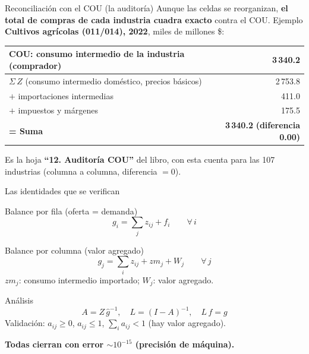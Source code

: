 \documentclass[aspectratio=169,10pt]{beamer}
\newcommand{\dg}[1]{\widehat{#1}}
\begin{document}
\begin{frame}{Reconciliación con el COU (la auditoría)}
  Aunque las celdas se reorganizan, \textbf{el total de compras de cada industria cuadra exacto} contra el COU.
  Ejemplo \textbf{Cultivos agrícolas (011/014), 2022}, miles de millones \$:
  \begin{center}
  \begin{tabular}{lr}
    \toprule
    COU: consumo intermedio de la industria (comprador) & \textbf{3\,340.2} \\
    \midrule
    $\Sigma\,Z$ (consumo intermedio doméstico, precios básicos) & 2\,753.8 \\
    $+$ importaciones intermedias & 411.0 \\
    $+$ impuestos y márgenes & 175.5 \\
    \midrule
    \textbf{= Suma} & \textbf{3\,340.2} \quad\color{verdeok}\textbf{(diferencia 0.00)} \\
    \bottomrule
  \end{tabular}
  \end{center}
  \vspace{0.3em}
  \begin{center}\small\color{gris}
  Es la hoja \textbf{``12. Auditoría COU''} del libro, con esta cuenta para las 107 industrias
  (columna a columna, diferencia $=0$).
  \end{center}
\end{frame}

\begin{frame}{Las identidades que se verifican}
  \begin{block}{Balance por fila (oferta = demanda)}
  \[ g_i = \sum_j z_{ij} + f_i \qquad \forall\, i \]
  \end{block}
  \begin{block}{Balance por columna (valor agregado)}
  \[ g_j = \sum_i z_{ij} + zm_j + W_j \qquad \forall\, j \]
  \footnotesize $zm_j$: consumo intermedio importado; \; $W_j$: valor agregado.
  \end{block}
  \begin{block}{Análisis}
  \[ A = Z\,\dg{g}^{-1}, \quad L = (I-A)^{-1}, \quad L\,f = g \]
  Validación: $a_{ij}\ge 0$, \; $a_{ij}\le 1$, \; $\sum_i a_{ij} < 1$ (hay valor agregado).
  \end{block}
  \begin{center}\small\color{verdeok}\textbf{Todas cierran con error $\sim 10^{-15}$ (precisión de máquina).}\end{center}
\end{frame}
\end{document}
